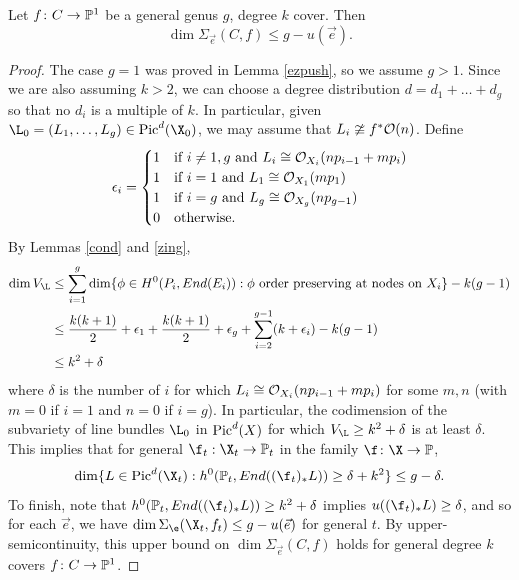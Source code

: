 \begin{Lemma}
\notready \label{dimbound}
Let $f\colon  C \rightarrow \mathbb{P}^1$ be a general genus $g$, degree $k$ cover. Then
\[\dim \Sigma_{\vec{e}}(C, f) \leq g - u(\vec{e}).\]
\end{Lemma}
\begin{proof}
The case $g = 1$ was proved in Lemma \ref{ezpush}, so we assume $g > 1$. Since we are also assuming $k > 2$, we can choose a degree distribution $d = d_1 + \ldots + d_g$ so that no $d_i$ is a multiple of $k$. In particular, given $\L_0 = (L_1, \ldots, L_g) \in \Pic^d(\X_0)$, we may assume that $L_i \ncong f^*\mathcal{O}(n)$.
Define
\[\epsilon_i = \begin{cases} 1 & \text{if $i \neq 1, g$ and $L_i \cong  \mathcal{O}_{X_i}(np_{i-1} + mp_i)$} \\ 1 & \text{if $i = 1$ and $L_1 \cong \mathcal{O}_{X_1}(mp_1)$} \\ 1 & \text{if $i = g$ and $L_g \cong \mathcal{O}_{X_g}(np_{g-1})$} \\ 0 &\text{otherwise.} \end{cases}\]
By Lemmas \ref{cond} and \ref{zing},
\begin{align*}
\dim V_{\L} &\leq \sum_{i=1}^g \dim \{\phi \in H^0(P_i, End(E_i)) : \phi \text{ order preserving at nodes on $X_i$}\} - k(g-1) \\
&\leq \frac{k(k+1)}{2} +\epsilon_1 + \frac{k(k+1)}{2} +\epsilon_g + \sum_{i=2}^{g-1} (k + \epsilon_i ) - k(g-1)\\
&\leq k^2 + \delta
\end{align*}
where $\delta$ is the number of $i$ for which $L_i \cong \mathcal{O}_{X_i}(np_{i-1} + mp_{i})$ for some $m, n$ (with $m = 0$ if $i = 1$ and $n = 0$ if $i = g$).  In particular, the codimension of the subvariety of line bundles $\L_0$ in $\operatorname{Pic}^d(X)$ for which $V_{\L} \geq k^2 + \delta$ is at least $\delta$. This implies that for general $\f_t: \X_t \rightarrow \P_t$ in the family $\f\colon  \X \rightarrow \P$,
\[\dim\{L \in \Pic^d(\X_t) : h^0(\P_t, End((\f_t)_*L)) \geq \delta +k^2\} \leq g - \delta.\]
To finish, note that $h^0(\P_t, End((\f_t)_*L)) \geq k^2+\delta$ implies $u((\f_t)_*L) \geq \delta$, and so for each $\vec{e}$, we have $\dim \Sigma_{\e}(\X_t, f_t) \leq g - u(\vec{e})$ for general $t$. By upper-semicontinuity, this upper bound on $\dim \Sigma_{\vec{e}}(C, f)$ holds for general degree $k$ covers $f\colon  C \rightarrow \mathbb{P}^1$.
\end{proof}
